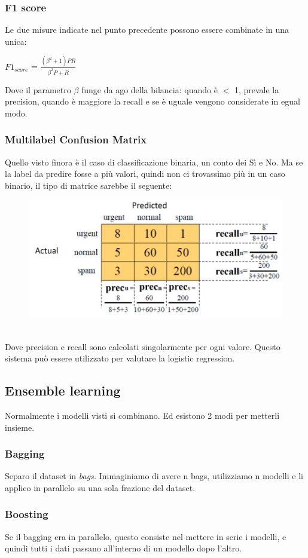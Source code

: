 \newpage

\subsubsection{F1 score}
Le due misure indicate nel punto precedente possono essere combinate in una unica: 
\begin{center}
   $F1_{score}$ = $\frac{(\beta^2 + 1) PR}{\beta ^2 P + R}$
\end{center}
Dove il parametro $\beta$ funge da ago della bilancia: quando è $<$ 1, prevale la precision, quando è maggiore la recall e se è uguale vengono considerate in egual modo. 

\subsubsection{Multilabel Confusion Matrix}
Quello visto finora è il caso di classificazione binaria, un conto dei Sì e No. Ma se la label da predire fosse a più valori, quindi non ci trovassimo più in un caso binario, il tipo di matrice sarebbe il seguente:
\\
\begin{figure}[th]
    \centering
    \includegraphics[scale=0.55]{ML/img/multilabel matrix.png}
\end{figure}
\\
Dove precision e recall sono calcolati singolarmente per ogni valore. Questo sistema può essere utilizzato per valutare la logistic regression. 

\subsection{Ensemble learning}
Normalmente i modelli visti si combinano. Ed esistono 2 modi per metterli insieme.
\subsubsection{Bagging}
Separo il dataset in \textit{bags.} Immaginiamo di avere n bags, utilizziamo n modelli e li applico in parallelo su una sola frazione del dataset. 
\subsubsection{Boosting} 
Se il bagging era in parallelo, questo consiste nel mettere in serie i modelli, e quindi tutti i dati passano all'interno di un modello dopo l'altro.